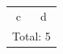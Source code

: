 \documentclass{article}
\begin{document}
\begin{tabular}{cc}
c & d\\
\multicolumn{2}{l}{Total: 5}
\end{tabular}
\end{document}
